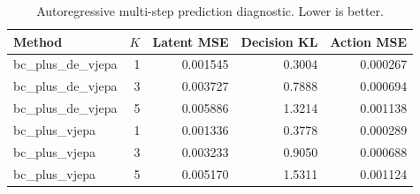 \begin{table}[t]
\centering
\caption{Autoregressive multi-step prediction diagnostic. Lower is better.}
\label{tab:multistep-diagnostic}
\begin{tabular}{lrrrr}
\toprule
\textbf{Method} & \textbf{$K$} & \textbf{Latent MSE} & \textbf{Decision KL} & \textbf{Action MSE} \\
\midrule
bc\_plus\_de\_vjepa & 1 & 0.001545 & 0.3004 & 0.000267 \\
bc\_plus\_de\_vjepa & 3 & 0.003727 & 0.7888 & 0.000694 \\
bc\_plus\_de\_vjepa & 5 & 0.005886 & 1.3214 & 0.001138 \\
bc\_plus\_vjepa & 1 & 0.001336 & 0.3778 & 0.000289 \\
bc\_plus\_vjepa & 3 & 0.003233 & 0.9050 & 0.000688 \\
bc\_plus\_vjepa & 5 & 0.005170 & 1.5311 & 0.001124 \\
\bottomrule
\end{tabular}
\end{table}
